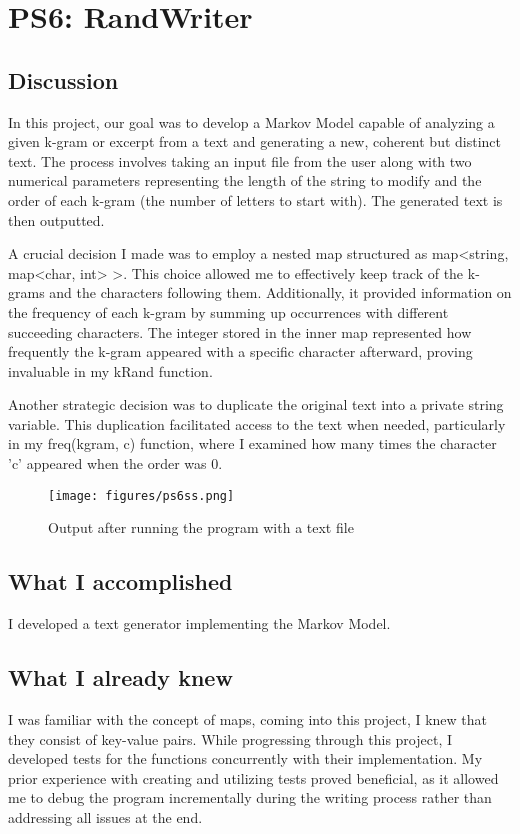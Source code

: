 \section{PS6: RandWriter}\label{sec:ps6}

\subsection{Discussion}\label{sec:ps6:disc}

In this project, our goal was to develop a Markov Model capable of analyzing a given k-gram or excerpt from a text and generating a new, coherent but distinct text. The process involves taking an input file from the user along with two numerical parameters representing the length of the string to modify and the order of each k-gram (the number of letters to start with). The generated text is then outputted.

A crucial decision I made was to employ a nested map structured as map<string, map<char, int> >. This choice allowed me to effectively keep track of the k-grams and the characters following them. Additionally, it provided information on the frequency of each k-gram by summing up occurrences with different succeeding characters. The integer stored in the inner map represented how frequently the k-gram appeared with a specific character afterward, proving invaluable in my kRand function.

Another strategic decision was to duplicate the original text into a private string variable. This duplication facilitated access to the text when needed, particularly in my freq(kgram, c) function, where I examined how many times the character 'c' appeared when the order was 0.

\begin{figure}[tbh]
	\centering
	\texttt{[image: figures/ps6ss.png]}
	\caption{Output after running the program with a text file}
	\label{fig:ps6ss}
\end{figure}

\subsection{What I accomplished}\label{sec:ps6:accomplish}

I developed a text generator implementing the Markov Model.

\subsection{What I already knew}\label{sec:ps6:knew}
I was familiar with the concept of maps, coming into this project, I knew that they consist of key-value pairs. While progressing through this project, I developed tests for the functions concurrently with their implementation. My prior experience with creating and utilizing tests proved beneficial, as it allowed me to debug the program incrementally during the writing process rather than addressing all issues at the end.

